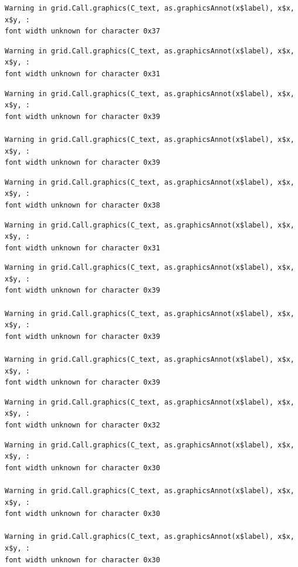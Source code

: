 \documentclass[
  letterpaper,
  DIV=11,
  numbers=noendperiod]{scrreprt}
\begin{document}
\begin{verbatim}
Warning in grid.Call.graphics(C_text, as.graphicsAnnot(x$label), x$x, x$y, :
font width unknown for character 0x37
\end{verbatim}

\begin{verbatim}
Warning in grid.Call.graphics(C_text, as.graphicsAnnot(x$label), x$x, x$y, :
font width unknown for character 0x31
\end{verbatim}

\begin{verbatim}
Warning in grid.Call.graphics(C_text, as.graphicsAnnot(x$label), x$x, x$y, :
font width unknown for character 0x39

Warning in grid.Call.graphics(C_text, as.graphicsAnnot(x$label), x$x, x$y, :
font width unknown for character 0x39
\end{verbatim}

\begin{verbatim}
Warning in grid.Call.graphics(C_text, as.graphicsAnnot(x$label), x$x, x$y, :
font width unknown for character 0x38
\end{verbatim}

\begin{verbatim}
Warning in grid.Call.graphics(C_text, as.graphicsAnnot(x$label), x$x, x$y, :
font width unknown for character 0x31
\end{verbatim}

\begin{verbatim}
Warning in grid.Call.graphics(C_text, as.graphicsAnnot(x$label), x$x, x$y, :
font width unknown for character 0x39

Warning in grid.Call.graphics(C_text, as.graphicsAnnot(x$label), x$x, x$y, :
font width unknown for character 0x39

Warning in grid.Call.graphics(C_text, as.graphicsAnnot(x$label), x$x, x$y, :
font width unknown for character 0x39
\end{verbatim}

\begin{verbatim}
Warning in grid.Call.graphics(C_text, as.graphicsAnnot(x$label), x$x, x$y, :
font width unknown for character 0x32
\end{verbatim}

\begin{verbatim}
Warning in grid.Call.graphics(C_text, as.graphicsAnnot(x$label), x$x, x$y, :
font width unknown for character 0x30

Warning in grid.Call.graphics(C_text, as.graphicsAnnot(x$label), x$x, x$y, :
font width unknown for character 0x30

Warning in grid.Call.graphics(C_text, as.graphicsAnnot(x$label), x$x, x$y, :
font width unknown for character 0x30
\end{verbatim}
\end{document}
